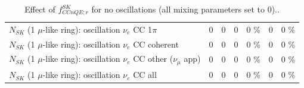 \begin{table}
\begin{tabular}{| l | r | r | r  r | r  r |}
                     $N_{SK}$ (1 $\mu$-like ring): oscillation $\nu_e$ CC 1$\pi$ &               0 &               0 &               0 &        0 \%  &               0 &        0 \%  \\ 
                   $N_{SK}$ (1 $\mu$-like ring): oscillation $\nu_e$ CC coherent &               0 &               0 &               0 &        0 \%  &               0 &        0 \%  \\ 
      $N_{SK}$ (1 $\mu$-like ring): oscillation $\nu_e$ CC other ($\nu_\mu$ app) &               0 &               0 &               0 &        0 \%  &               0 &        0 \%  \\ 
                       $N_{SK}$ (1 $\mu$-like ring): oscillation $\nu_e$  CC all &               0 &               0 &               0 &        0 \%  &               0 &        0 \%  \\ 
\hline
\hline
\end{tabular}
\caption{ Effect of $f_{CCnQE; r}^{SK}$ for no oscillations (all mixing parameters set to 0).. }
\label{tab:num_sk_1Rmu_ccnonqe_eff_1RmuT_3f_osc_t13:0}
\end{table}
\clearpage
